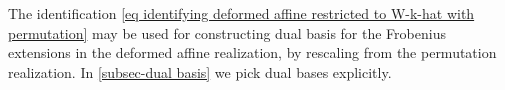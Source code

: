 




\begin{remark}\label{rmk dual basis from permutation realization} 
The identification \cref{eq identifying deformed affine restricted to W-k-hat with permutation} may be used for constructing dual basis for the Frobenius extensions in the deformed affine realization, by rescaling from the permutation realization. In \cref{subsec-dual basis} we pick dual bases explicitly.
\end{remark}

